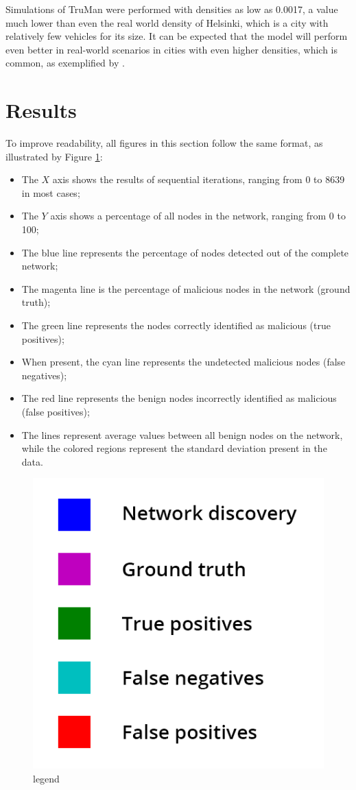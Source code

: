 Simulations of TruMan were performed with densities as low as 0.0017, a value much lower than even the real world density of Helsinki, which is a city with relatively few vehicles for its size.
It can be expected that the model will perform even better in real-world scenarios in cities with even higher densities, which is common, as exemplified by .

%

\section{Results}
\label{section:results}

To improve readability, all figures in this section follow the same format, as illustrated by Figure \ref{fig:legend}:
\begin{itemize}
	\item The $X$ axis shows the results of sequential iterations, ranging from 0 to 8639 in most cases;
	\item The $Y$ axis shows a percentage of all nodes in the network, ranging from 0 to 100;
	\item The blue line represents the percentage of nodes detected out of the complete network;
	\item The magenta line is the percentage of malicious nodes in the network (ground truth);
	\item The green line represents the nodes correctly identified as malicious (true positives);
	\item When present, the cyan line represents the undetected malicious nodes (false negatives); 
	\item The red line represents the benign nodes incorrectly identified as malicious (false positives);
	\item The lines represent average values between all benign nodes on the network, while the colored regions represent the standard deviation present in the data.
\end{itemize}

\begin{figure}[h]
\centering
\includegraphics[width=0.3\linewidth]{images/legend2.png}
\caption{legend} 
\label{fig:legend}
\end{figure}

